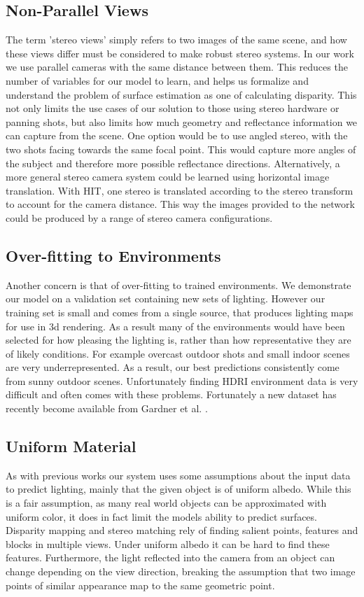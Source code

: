 \documentclass[ %
                    author={Gavin Parker},
                supervisor={Dr. Neill Campbell},
                    degree={MEng},
                     title={Deep Siamese Networks for Illumination Estimation from Stereo Images},
                  subtitle={},
                      type={Research},
                      year={2018} ]{dissertation}
\begin{document}
\subsection{Non-Parallel Views}
The term 'stereo views' simply refers to two images of the same scene, and how these views differ must be considered to make robust stereo systems. In our work we use parallel cameras with the same distance between them. This reduces the number of variables for our model to learn, and helps us formalize and understand the problem of surface estimation as one of calculating disparity. This not only limits the use cases of our solution to those using stereo hardware or panning shots, but also limits how much geometry and reflectance information we can capture from the scene. One option would be to use angled stereo, with the two shots facing towards the same focal point. This would capture more angles of the subject and therefore more possible reflectance directions. Alternatively, a more general stereo camera system could be learned using horizontal image translation. With HIT, one stereo is translated according to the stereo transform to account for the camera distance. This way the images provided to the network could be produced by a range of stereo camera configurations.
\newline
\subsection{Over-fitting to Environments}
Another concern is that of over-fitting to trained environments. We demonstrate our model on a validation set containing new sets of lighting. However our training set is small and comes from a single source, that produces lighting maps for use in 3d rendering. As a result many of the environments would have been selected for how pleasing the lighting is, rather than how representative they are of likely conditions. For example overcast outdoor shots and small indoor scenes are very underrepresented. As a result, our best predictions consistently come from sunny outdoor scenes. Unfortunately finding HDRI environment data is very difficult and often comes with these problems. Fortunately a new dataset has recently become available from Gardner et al. \cite{gardner-sigasia-17}.
\subsection{Uniform Material}
As with previous works our system uses some assumptions about the input data to predict lighting, mainly that the given object is of uniform albedo. While this is a fair assumption, as many real world objects can be approximated with uniform color, it does in fact limit the models ability to predict surfaces. Disparity mapping and stereo matching rely of finding salient points, features and blocks in multiple views. Under uniform albedo it can be hard to find these features. Furthermore, the light reflected into the camera from an object can change depending on the view direction, breaking the assumption that two image points of similar appearance map to the same geometric point.
\end{document}
